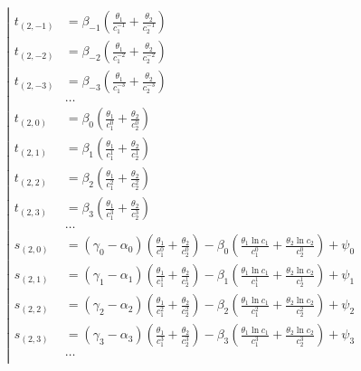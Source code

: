 \begin{equation*} \left| \begin{aligned}
t_{(2,-1)} &=
  \beta_{-1} \left(
  \frac{\theta_1}{c_1^{-1}}
+ \frac{\theta_2}{c_2^{-1}} \right) \\
%
t_{(2,-2)} &=
  \beta_{-2} \left(
  \frac{\theta_1}{c_1^{-2}}
+ \frac{\theta_2}{c_2^{-2}} \right) \\
%
t_{(2,-3)} &=
  \beta_{-3} \left(
  \frac{\theta_1}{c_1^{-3}}
+ \frac{\theta_2}{c_2^{-3}} \right) \\
%
&\ldots \\
%
t_{(2,0)} &=
  \beta_0 \left(
  \frac{\theta_1}{c_1^0}
+ \frac{\theta_2}{c_2^0} \right) \\
%
t_{(2,1)} &=
  \beta_1 \left(
  \frac{\theta_1}{c_1^1}
+ \frac{\theta_2}{c_2^1} \right) \\
%
t_{(2,2)} &=
  \beta_2 \left(
  \frac{\theta_1}{c_1^2}
+ \frac{\theta_2}{c_2^2} \right) \\
%
t_{(2,3)} &=
  \beta_3 \left(
  \frac{\theta_1}{c_1^3}
+ \frac{\theta_2}{c_2^3} \right) \\
%
&\ldots \\
%
s_{(2,0)} &=
  (\gamma_0 - \alpha_0) \left(
  \frac{\theta_1}{c_1^0}
+ \frac{\theta_2}{c_2^0} \right)
- \beta_0 \left(
  \frac{\theta_1 \ln{c_1}}{c_1^0}
+ \frac{\theta_2 \ln{c_2}}{c_2^0} \right)
+ \psi_0 \\
%
s_{(2,1)} &=
  (\gamma_1 - \alpha_1) \left(
  \frac{\theta_1}{c_1^1}
+ \frac{\theta_2}{c_2^1} \right)
- \beta_1 \left(
  \frac{\theta_1 \ln{c_1}}{c_1^1}
+ \frac{\theta_2 \ln{c_2}}{c_2^1} \right)
+ \psi_1 \\
%
s_{(2,2)} &=
  (\gamma_2 - \alpha_2) \left(
  \frac{\theta_1}{c_1^2}
+ \frac{\theta_2}{c_2^2} \right)
- \beta_2 \left(
  \frac{\theta_1 \ln{c_1}}{c_1^2}
+ \frac{\theta_2 \ln{c_2}}{c_2^2} \right)
+ \psi_2 \\
%
s_{(2,3)} &=
  (\gamma_3 - \alpha_3) \left(
  \frac{\theta_1}{c_1^3}
+ \frac{\theta_2}{c_2^3} \right)
- \beta_3 \left(
  \frac{\theta_1 \ln{c_1}}{c_1^3}
+ \frac{\theta_2 \ln{c_2}}{c_2^3} \right)
+ \psi_3 \\
%
&\ldots \\
\end{aligned} \right. \end{equation*}

